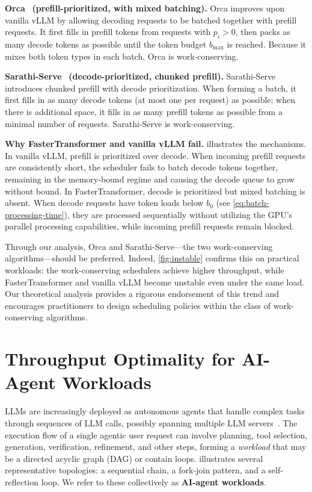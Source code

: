 \documentclass[11pt]{article}
\theoremstyle{plain}
\theoremstyle{definition}
\theoremstyle{remark}
\begin{document}
\textbf{Orca}~\citep{yu2022orca} \textbf{(prefill-prioritized, with mixed batching).}
Orca improves upon vanilla vLLM by allowing decoding requests to be batched together with prefill requests. It first fills in prefill tokens from requests with $p_i > 0$, then packs as many decode tokens as possible until the token budget $b_{\max}$ is reached. Because it mixes both token types in each batch, Orca is work-conserving.

\textbf{Sarathi-Serve}~\citep{agrawal2023sarathi} \textbf{(decode-prioritized, chunked prefill).}
Sarathi-Serve introduces chunked prefill with decode prioritization. When forming a batch, it first fills in as many decode tokens (at most one per request) as possible; when there is additional space, it fills in as many prefill tokens as possible from a minimal number of requests. Sarathi-Serve is work-conserving.

\textbf{Why FasterTransformer and vanilla vLLM fail.}
 illustrates the mechanisms. In vanilla vLLM, prefill is prioritized over decode. When incoming prefill requests are consistently short, the scheduler fails to batch decode tokens together, remaining in the memory-bound regime and causing the decode queue to grow without bound. In FasterTransformer, decode is prioritized but mixed batching is absent. When decode requests have token loads below $b_0$ (see \cref{eq:batch-processing-time}), they are processed sequentially without utilizing the GPU's parallel processing capabilities, while incoming prefill requests remain blocked.

Through our analysis, Orca and Sarathi-Serve---the two work-conserving algorithms---should be preferred. Indeed, \cref{fig:instable} confirms this on practical workloads: the work-conserving schedulers achieve higher throughput, while FasterTransformer and vanilla vLLM become unstable even under the same load. Our theoretical analysis provides a rigorous endorsement of this trend and encourages practitioners to design scheduling policies within the class of work-conserving algorithms.


\section{Throughput Optimality for AI-Agent Workloads}
\label{sec:AI-agent}

LLMs are increasingly deployed as autonomous agents that handle complex tasks through sequences of LLM calls, possibly spanning multiple LLM servers~\citep{luo2025autellix}. The execution flow of a single agentic user request can involve planning, tool selection, generation, verification, refinement, and other steps, forming a \emph{workload} that may be a directed acyclic graph (DAG) or contain loops.  illustrates several representative topologies: a sequential chain, a fork-join pattern, and a self-reflection loop. We refer to these collectively as \textbf{AI-agent workloads}.
\end{document}
